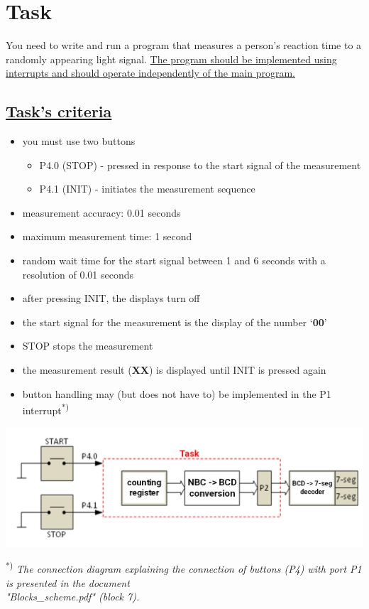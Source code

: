 \documentclass{article}
\begin{document}
\section*{Task}
You need to write and run a program that measures a person's reaction time to a randomly appearing light signal. \underline{The program should be implemented using interrupts and should operate independently of the main program.}

\subsection*{\underline{Task's criteria}}
\begin{itemize}
    \item you must use two buttons
    \begin{itemize}
        \item P4.0 (STOP) - pressed in response to the start signal of the measurement
        \item P4.1 (INIT) - initiates the measurement sequence
    \end{itemize}
    \item measurement accuracy: 0.01 seconds
    \item maximum measurement time: 1 second
    \item random wait time for the start signal between 1 and 6 seconds with a resolution of 0.01 seconds
    \item after pressing INIT, the displays turn off
    \item the start signal for the measurement is the display of the number \textquoteleft\textbf{00}\textquoteright
    \item STOP stops the measurement
    \item the measurement result (\textbf{XX}) is displayed until INIT is pressed again
    \item button handling may (but does not have to) be implemented in the P1 interrupt\textsuperscript{*)}
\end{itemize}

\noindent\includegraphics[width=\textwidth]{"../img/TIMER_A_NBC2BCD_2.png"}
\vspace{5mm}

\textsuperscript{*)} \textit{The connection diagram explaining the connection of buttons (P4) with port P1 is presented in the document \\ "Blocks\_scheme.pdf" (block 7).}
\end{document}
